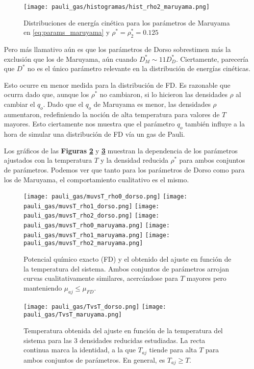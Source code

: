 \begin{figure}[H]
	\centering
	\texttt{[image: pauli\_gas/histogramas/hist\_rho2\_maruyama.png]}
	\caption{Distribuciones de energía cinética para los parámetros de Maruyama en \eqref{eq:params_maruyama} y $\rho^* = \rho_2^* = 0.125$}
	\label{fig:hist_rho2_maruyama}
\end{figure}

Pero más llamativo aún es que los parámetros de Dorso sobrestimen más la exclusión que los de Maruyama, aún cuando $D^*_M \sim 11 D^*_D$.
Ciertamente, parecería que $D^*$ no es el único parámetro relevante en la distribución de energías cinéticas.

Esto ocurre en menor medida para la distribución de FD.
Es razonable que ocurra dado que, aunque los $\rho^*$ no cambiaron, si lo hicieron las densidades $\rho$ al cambiar el $q_o$.
Dado que el $q_o$ de Maruyama es menor, las densidades $\rho$ aumentaron, redefiniendo la noción de alta temperatura para valores de $T$ mayores.
Esto ciertamente nos muestra que el parámetro $q_o$ también influye a la hora de simular una distribución de FD vía un gas de Pauli.

Los gráficos de las \textbf{Figuras \ref{fig:muvsT}} y \textbf{\ref{fig:TvsT}} muestran la dependencia de los parámetros ajustados con la temperatura
$T$ y la densidad reducida $\rho^*$ para ambos conjuntos de parámetros.
Podemos ver que tanto para los parámetros de Dorso como para los de Maruyama, el comportamiento cualitativo es el mismo.

\begin{figure}[H]
	\centering
	\texttt{[image: pauli\_gas/muvsT\_rho0\_dorso.png]}
	\texttt{[image: pauli\_gas/muvsT\_rho1\_dorso.png]}
	\texttt{[image: pauli\_gas/muvsT\_rho2\_dorso.png]}
	\texttt{[image: pauli\_gas/muvsT\_rho0\_maruyama.png]}
	\texttt{[image: pauli\_gas/muvsT\_rho1\_maruyama.png]}
	\texttt{[image: pauli\_gas/muvsT\_rho2\_maruyama.png]}
	\caption{Potencial químico exacto (FD) y el obtenido del ajuste en función de la temperatura del sistema.
		Ambos conjuntos de parámetros arrojan curvas cualitativamente similares, acercándose para $T$ mayores pero manteniendo $\mu_{aj}\leq \mu_{FD}$.}
	\label{fig:muvsT}
\end{figure}
\begin{figure}[H]
	\centering
	\texttt{[image: pauli\_gas/TvsT\_dorso.png]}
	\texttt{[image: pauli\_gas/TvsT\_maruyama.png]}
	\caption{Temperatura obtenida del ajuste en función de la temperatura del sistema para las 3 densidades reducidas estudiadas.
		La recta continua marca la identidad, a la que $T_{aj}$ tiende para alta $T$ para ambos conjuntos de parámetros.
		En general, es $T_{aj}\geq T$.}
	\label{fig:TvsT}
\end{figure}

